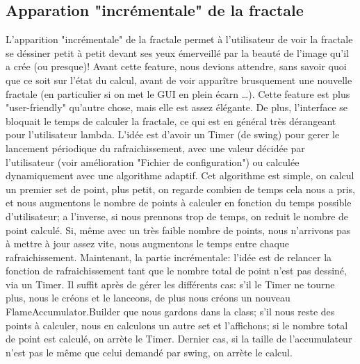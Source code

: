 \documentclass[a4paper]{article}
\begin{document}
\subsection*{Apparation "incrémentale" de la fractale}
L'apparition "incrémentale" de la fractale permet à l'utilisateur de voir la fractale se déssiner petit à petit devant ses yeux émerveillé par la beauté de l'image qu'il a crée (ou presque)! Avant cette feature, nous devions attendre, sans savoir quoi que ce soit sur l'état du calcul, avant de voir apparître brusquement une nouvelle fractale (en particulier si on met le GUI en plein écarn \ldots). Cette feature est plus "user-friendly" qu'autre chose, mais elle est assez élégante. De plus, l'interface se bloquait le temps de calculer la fractale, ce qui est en général très dérangeant pour l'utilisateur lambda.
L'idée est d'avoir un Timer (de swing) pour gerer le lancement périodique du rafraichissement, avec une valeur décidée par l'utilisateur (voir amélioration "Fichier de configuration") ou calculée dynamiquement avec une algorithme adaptif. Cet algorithme est simple, on calcul un premier set de point, plus petit, on regarde combien de temps cela nous a pris, et nous augmentons le nombre de points à calculer en fonction du temps possible d'utilisateur; a l'inverse, si nous prennons trop de temps, on reduit le nombre de point calculé. Si, même avec un très faible nombre de points, nous n'arrivons pas à mettre à jour assez vite, nous augmentons le temps entre chaque rafraichissement. Maintenant, la partie incrémentale: l'idée est de relancer la fonction de rafraichissement tant que le nombre total de point n'est pas dessiné, via un Timer. Il suffit après de gérer les différents cas: s'il le Timer ne tourne plus, nous le créons et le lanceons, de plus nous créons un nouveau FlameAccumulator.Builder que nous gardons dans la class; s'il nous reste des points à calculer, nous en calculons un autre set et l'affichons; si le nombre total de point est calculé, on arrète le Timer. Dernier cas, si la taille de l'accumulateur n'est pas le même que celui demandé par swing, on arrète le calcul.
\end{document}
